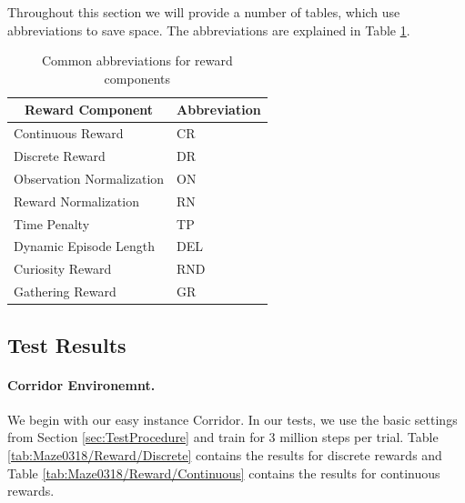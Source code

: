 Throughout this section we will provide a number of tables, which use abbreviations to save space. The abbreviations are explained in Table \ref{tab:RewardAbbreviations}.  

\begin{table} [ht]
    \begin{center}
        \small
        \begin{tabular}{ll}
            \toprule
            \multicolumn{1}{c}{Reward Component} & Abbreviation \\
            \midrule
            Continuous Reward & CR \\
            Discrete Reward & DR \\
            Observation Normalization & ON \\
            Reward Normalization & RN \\
            Time Penalty & TP \\
            Dynamic Episode Length & DEL \\
            Curiosity Reward & RND \\
            Gathering Reward & GR \\
            \bottomrule
        \end{tabular}
    \end{center}
    \caption[Abbreviations for Reward Components]{Common abbreviations for reward components} \label{tab:RewardAbbreviations}
\end{table}


\subsection{Test Results} \label{sec:RewardTestResults}

\paragraph{Corridor Environemnt.}
We begin with our easy instance Corridor. In our tests, we use the basic settings from Section \ref{sec:TestProcedure} and train for 3 million steps per trial. Table \ref{tab:Maze0318/Reward/Discrete} contains the results for discrete rewards and Table \ref{tab:Maze0318/Reward/Continuous} contains the results for continuous rewards.

